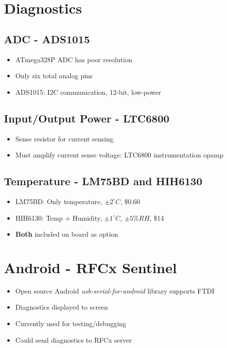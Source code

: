 \documentclass{article}
\numberwithin{figure}{section}
\numberwithin{equation}{section}
\begin{document}
{\section{Diagnostics}
\subsection{ADC - ADS1015}
\begin{itemize}
    \item ATmega328P ADC has poor resolution
    \item Only six total analog pins
    \item ADS1015: I2C communication, 12-bit, low-power
\end{itemize}

\subsection{Input/Output Power - LTC6800}
\begin{itemize}
    \item Sense resistor for current sensing
    \item Must amplify current sense voltage: LTC6800 instrumentation opamp
\end{itemize}

\subsection{Temperature - LM75BD and HIH6130}
\begin{itemize}
    \item LM75BD: Only temperature, $\pm2^{\circ} C$, \$0.60
    \item HIH6130: Temp + Humidity, $\pm1^{\circ} C$, $\pm5\% RH$, \$14
    \item \textbf{Both} included on board as option
\end{itemize}

\section{Android - RFCx Sentinel}
\begin{itemize}
    \item Open source Android \textit{usb-serial-for-android} library supports FTDI
    \item Diagnostics displayed to screen
    \item Currently used for testing/debugging
    \item Could send diagnostics to RFCx server
\end{itemize}

}
\end{document}
